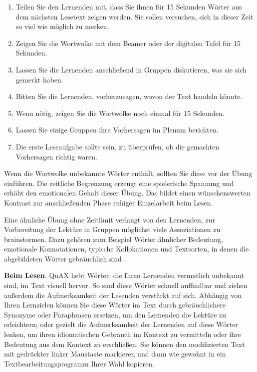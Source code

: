 \documentclass[11pt]{article}\usepackage[]{graphicx}\usepackage[]{color}
\begin{document}
\begin{enumerate}
\itemsep0em 
\item Teilen Sie den Lernenden mit, dass Sie ihnen für 15 Sekunden Wörter aus dem nächsten Lesetext zeigen werden. Sie sollen versuchen, sich in dieser Zeit so viel wie möglich zu merken. 
\item Zeigen Sie die Wortwolke mit dem Beamer oder der digitalen Tafel für 15 Sekunden. 
\item Lassen Sie die Lernenden anschließend in Gruppen diskutieren, was sie sich gemerkt haben.
\item Bitten Sie die Lernenden, vorherzusagen, wovon der Text handeln könnte. 
\item Wenn nötig, zeigen Sie die Wortwolke noch einmal für 15 Sekunden. 
\item Lassen Sie einige Gruppen ihre Vorhersagen im Plenum berichten.  
\item Die erste Leseaufgabe sollte sein, zu überprüfen, ob die gemachten Vorhersagen richtig waren. 
\end{enumerate}

\noindent Wenn die Wortwolke unbekannte Wörter enthält, sollten Sie diese vor der Übung einführen. Die zeitliche Begrenzung erzeugt eine spielerische Spannung und erhöht den emotionalen Gehalt dieser Übung. Das bildet einen wünschenswerten Kontrast zur anschließenden Phase ruhiger Einzelarbeit beim Lesen. 

Eine ähnliche Übung ohne Zeitlimit verlangt von den Lernenden, zur Vorbereitung der Lektüre in Gruppen möglichst viele Assoziationen zu brainstormen. Dazu gehören zum Beispiel Wörter ähnlicher Bedeutung, emotionale Konnotationen, typische Kollokationen und Textsorten, in denen die abgebildeten Wörter gebräuchlich sind \parencite[32]{Watkins.2017}. 

\noindent \textbf{Beim Lesen}. QuAX hebt Wörter, die Ihren Lernenden vermutlich unbekannt sind, im Text visuell hervor. So sind diese Wörter schnell auffindbar und ziehen außerdem die Aufmerksamkeit der Lesenden verstärkt auf sich. Abhängig von Ihren Lernzielen können Sie diese Wörter im Text durch gebräuchlichere Synonyme oder Paraphrasen ersetzen, um den Lernenden die Lektüre zu erleichtern; oder gezielt die Aufmerksamkeit der Lernenden auf diese Wörter lenken, um ihren idiomatischen Gebrauch im Kontext zu vermitteln oder ihre Bedeutung aus dem Kontext zu erschließen. Sie können den modifizierten Text mit gedrückter linker Maustaste markieren und dann wie gewohnt in ein Textbearbeitungsprogramm Ihrer Wahl kopieren. 
\end{document}
